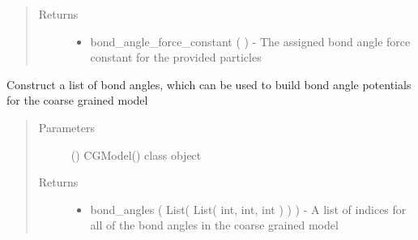 \documentclass[letterpaper,12pt,english,openany,oneside]{sphinxmanual}
\begin{document}
\begin{fulllineitems}
\begin{fulllineitems}
\begin{quote}
\begin{description}
\begin{itemize}
\end{itemize}

\item[{Returns}] \leavevmode
\begin{itemize}
\item {} 
bond\_angle\_force\_constant (  ) - The assigned bond angle force constant for the provided particles

\end{itemize}


\end{description}\end{quote}

\end{fulllineitems}


\begin{fulllineitems}
\label{\detokenize{cg_model:cg_model.cgmodel.CGModel.get_bond_angle_list}}
Construct a list of bond angles, which can be used to build bond angle potentials for the coarse grained model
\begin{quote}\begin{description}
\item[{Parameters}] \leavevmode
{} () \textendash{} CGModel() class object

\item[{Returns}] \leavevmode
\begin{itemize}
\item {} 
bond\_angles ( List( List( int, int, int ) ) ) - A list of indices for all of the bond angles in the coarse grained model

\end{itemize}


\end{description}\end{quote}

\end{fulllineitems}



\end{fulllineitems}
\end{document}
